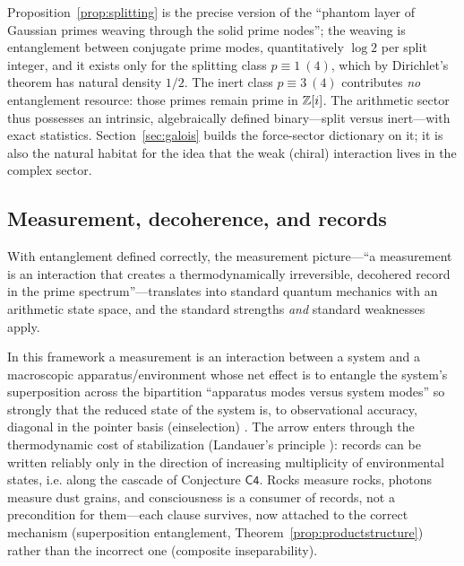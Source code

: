 Proposition~\ref{prop:splitting} is the precise version of the ``phantom layer of
Gaussian primes weaving through the solid prime nodes''; the weaving is entanglement between
conjugate prime modes, quantitatively $\log2$ per split integer, and it exists only for the
splitting class $p\equiv1\ (4)$, which by Dirichlet's theorem has natural density $1/2$. The
inert class $p\equiv3\ (4)$ contributes \emph{no} entanglement resource: those primes remain
prime in $\mathbb{Z}[i]$. The arithmetic sector thus possesses an intrinsic, algebraically defined
binary---split versus inert---with exact statistics. Section~\ref{sec:galois} builds the
force-sector dictionary on it; it is also the natural habitat for the idea that the
weak (chiral) interaction lives in the complex sector.

\subsection{Measurement, decoherence, and records}

With entanglement defined correctly, the measurement picture---``a measurement is an
interaction that creates a thermodynamically irreversible, decohered record in the prime
spectrum''---translates into standard quantum mechanics with an arithmetic
state space, and the standard strengths \emph{and} standard weaknesses apply.

\begin{remark}
In this framework a measurement is an interaction between a system and a
macroscopic apparatus/environment whose net effect is to entangle the system's
superposition across the bipartition ``apparatus modes versus system modes'' so strongly
that the reduced state of the system is, to observational accuracy, diagonal in the
pointer basis (einselection) \cite{zurek2003}. The arrow enters through the thermodynamic
cost of stabilization (Landauer's principle \cite{landauer1961}): records can be written
reliably only in the direction of increasing multiplicity of environmental states, i.e. along
the cascade of Conjecture $\mathsf{C4}$. Rocks measure rocks, photons measure dust grains,
and consciousness is a consumer of records, not a precondition for them---each clause
survives, now attached to the correct mechanism (superposition
entanglement, Theorem~\ref{prop:productstructure}) rather than the incorrect one
(composite inseparability).
\end{remark}

